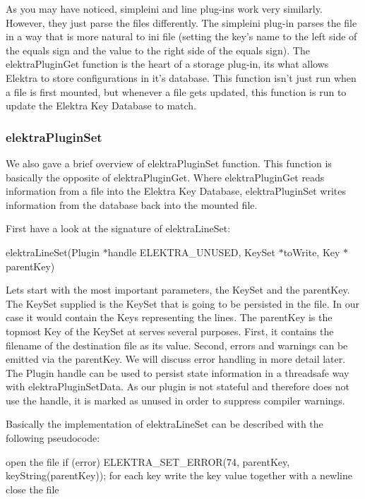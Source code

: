 As you may have noticed, simpleini and line plug-\/ins work very similarly. However, they just parse the files differently. The simpleini plug-\/in parses the file in a way that is more natural to ini file (setting the key's name to the left side of the equals sign and the value to the right side of the equals sign). The {\ttfamily elektra\+Plugin\+Get} function is the heart of a storage plug-\/in, its what allows Elektra to store configurations in it's database. This function isn't just run when a file is first mounted, but whenever a file gets updated, this function is run to update the Elektra Key Database to match.

\subsubsection*{elektra\+Plugin\+Set}

We also gave a brief overview of {\ttfamily elektra\+Plugin\+Set} function. This function is basically the opposite of {\ttfamily elektra\+Plugin\+Get}. Where {\ttfamily elektra\+Plugin\+Get} reads information from a file into the Elektra Key Database, {\ttfamily elektra\+Plugin\+Set} writes information from the database back into the mounted file.

First have a look at the signature of {\ttfamily elektra\+Line\+Set}\+:

{\ttfamily elektra\+Line\+Set(\+Plugin $\ast$handle E\+L\+E\+K\+T\+R\+A\+\_\+\+U\+N\+U\+S\+E\+D, Key\+Set $\ast$to\+Write, Key $\ast$parent\+Key)}

Lets start with the most important parameters, the Key\+Set and the {\ttfamily parent\+Key}. The Key\+Set supplied is the Key\+Set that is going to be persisted in the file. In our case it would contain the Keys representing the lines. The {\ttfamily parent\+Key} is the topmost Key of the Key\+Set at serves several purposes. First, it contains the filename of the destination file as its value. Second, errors and warnings can be emitted via the parent\+Key. We will discuss error handling in more detail later. The Plugin handle can be used to persist state information in a threadsafe way with {\ttfamily elektra\+Plugin\+Set\+Data}. As our plugin is not stateful and therefore does not use the handle, it is marked as unused in order to suppress compiler warnings.

Basically the implementation of {\ttfamily elektra\+Line\+Set} can be described with the following pseudocode\+: \begin{DoxyVerb}    open the file
    if (error)
    {
            ELEKTRA_SET_ERROR(74, parentKey, keyString(parentKey));
    }
    for each key
    {
            write the key value together with a newline
    }
    close the file
\end{DoxyVerb}


